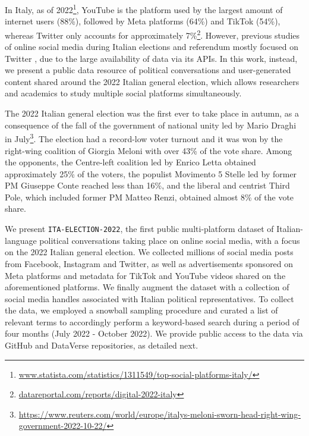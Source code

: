 \documentclass[sigconf,screen]{acmart}
\begin{document}
In Italy, as of 2022\footnote{\url{www.statista.com/statistics/1311549/top-social-platforms-italy/}}, YouTube is the platform used by the largest amount of internet users (88\%), followed by Meta platforms (64\%) and TikTok (54\%), whereas Twitter only accounts for approximately 7\%\footnote{\url{datareportal.com/reports/digital-2022-italy}}. However, previous studies of online social media during Italian elections and referendum mostly focused on Twitter \cite{rossi2021nearly}, due to the large availability of data via its APIs. In this work, instead, we present a public data resource of political conversations and user-generated content shared around the 2022 Italian general election, which allows researchers and academics to study multiple social platforms simultaneously.

The 2022 Italian general election was the first ever to take place in autumn, as a consequence of the fall of the government of national unity led by Mario Draghi in July\footnote{\url{https://www.reuters.com/world/europe/italys-meloni-sworn-head-right-wing-government-2022-10-22/}}. The election had a record-low voter turnout and it was won by the right-wing coalition of Giorgia Meloni with over 43\% of the vote share. Among the opponents, the Centre-left coalition led by Enrico Letta obtained approximately 25\% of the voters, the populist Movimento 5 Stelle led by former PM Giuseppe Conte reached less than 16\%, and the liberal and centrist Third Pole, which included former PM Matteo Renzi, obtained almost 8\% of the vote share.

We present \texttt{ITA-ELECTION-2022}, the first public multi-platform dataset of Italian-language political conversations taking place on online social media, with a focus on the 2022 Italian general election. We collected millions of social media posts from Facebook, Instagram and Twitter, as well as advertisements sponsored on Meta platforms and metadata for TikTok and YouTube videos shared on the aforementioned platforms. We finally augment the dataset with a collection of social media handles associated with Italian political representatives. To collect the data, we employed a snowball sampling procedure and curated a list of relevant terms to accordingly perform a keyword-based search during a period of four months (July 2022 - October 2022). We provide public access to the data via GitHub and DataVerse repositories, as detailed next. 
\end{document}
